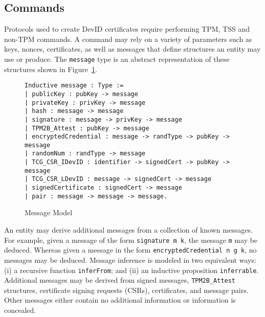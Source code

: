 \documentclass[runningheads]{llncs}
\begin{document}


\subsection{Commands}

Protocols used to create DevID certificates require performing TPM,
TSS and non-TPM commands. A command may rely on a variety of
parameters such as keys, nonces, certificates, as well as messages
that define structures an entity may use or produce. The
\verb|message| type is an abstract representation of these structures
shown in Figure~\ref{fig:message-model}.

\begin{figure}[hbtp]
\begin{lstlisting}[language=Coq]
Inductive message : Type :=
| publicKey : pubKey -> message
| privateKey : privKey -> message
| hash : message -> message
| signature : message -> privKey -> message
| TPM2B_Attest : pubKey -> message
| encryptedCredential : message -> randType -> pubKey -> message
| randomNum : randType -> message
| TCG_CSR_IDevID : identifier -> signedCert -> pubKey -> message
| TCG_CSR_LDevID : message -> signedCert -> message
| signedCertificate : signedCert -> message
| pair : message -> message -> message.
\end{lstlisting}
\caption{Message Model}
\label{fig:message-model}
\end{figure}

An entity may derive additional messages from a collection of known
messages.  For example, given a message of the form
\verb|signature m k|, the message \verb|m| may be deduced. Whereas
given a message in the form \verb|encryptedCredential n g k|, no
messages may be deduced.  Message inference is modeled in two
equivalent ways: (i) a recursive function \verb|inferFrom|; and (ii)
an inductive proposition \verb|inferrable|.  Additional messages may
be derived from signed messages, \verb|TPM2B_Attest| structures,
certificate signing requests (CSRs), certificates, and message
pairs. Other messages either contain no additional information or
information is concealed.
\end{document}
